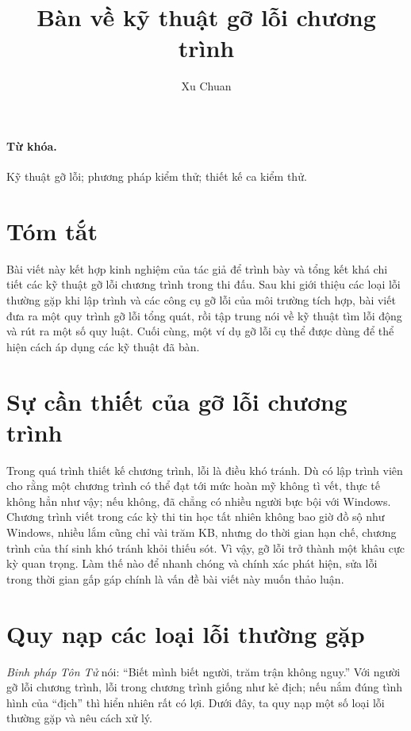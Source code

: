 \documentclass[11pt]{article}
\title{Bàn về kỹ thuật gỡ lỗi chương trình}
\author{Xu Chuan}
\date{}
\begin{document}
\maketitle


\paragraph{Từ khóa.}
Kỹ thuật gỡ lỗi; phương pháp kiểm thử; thiết kế ca kiểm thử.

\section*{Tóm tắt}

Bài viết này kết hợp kinh nghiệm của tác giả để trình bày và tổng kết khá
chi tiết các kỹ thuật gỡ lỗi chương trình trong thi đấu. Sau khi giới thiệu
các loại lỗi thường gặp khi lập trình và các công cụ gỡ lỗi của môi trường
tích hợp, bài viết đưa ra một quy trình gỡ lỗi tổng quát, rồi tập trung nói
về kỹ thuật tìm lỗi động và rút ra một số quy luật. Cuối cùng, một ví dụ gỡ
lỗi cụ thể được dùng để thể hiện cách áp dụng các kỹ thuật đã bàn.

\section{Sự cần thiết của gỡ lỗi chương trình}

Trong quá trình thiết kế chương trình, lỗi là điều khó tránh. Dù có lập trình
viên cho rằng một chương trình có thể đạt tới mức hoàn mỹ không tì vết, thực
tế không hẳn như vậy; nếu không, đã chẳng có nhiều người bực bội với Windows.
Chương trình viết trong các kỳ thi tin học tất nhiên không bao giờ đồ sộ như
Windows, nhiều lắm cũng chỉ vài trăm KB, nhưng do thời gian hạn chế, chương
trình của thí sinh khó tránh khỏi thiếu sót. Vì vậy, gỡ lỗi trở thành một
khâu cực kỳ quan trọng. Làm thế nào để nhanh chóng và chính xác phát hiện,
sửa lỗi trong thời gian gấp gáp chính là vấn đề bài viết này muốn thảo luận.

\section{Quy nạp các loại lỗi thường gặp}

\textit{Binh pháp Tôn Tử} nói: ``Biết mình biết người, trăm trận không
nguy.'' Với người gỡ lỗi chương trình, lỗi trong chương trình giống như kẻ
địch; nếu nắm đúng tình hình của ``địch'' thì hiển nhiên rất có lợi. Dưới
đây, ta quy nạp một số loại lỗi thường gặp và nêu cách xử lý.
\end{document}
